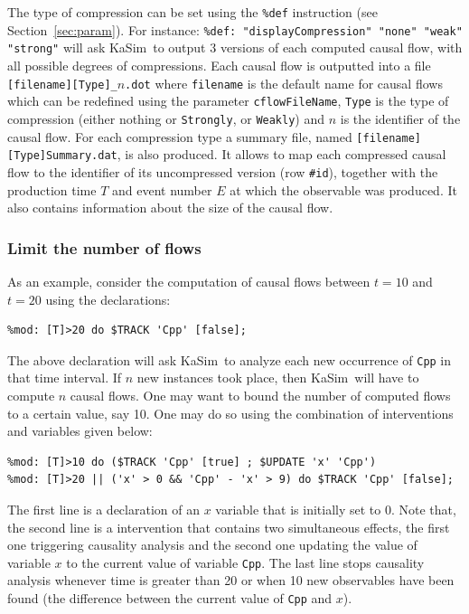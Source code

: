 \documentclass[11pt]{book}
\def\KaSim{\textsf{KaSim}}
\def\ttt#1{\texttt{#1}}
\def\var#1{{\textquotesingle}#1{\textquotesingle}}
\begin{document}
The type of compression can be set using the \texttt{\%def} instruction (see Section~\ref{sec:param}). For instance:
\lstinline[language=kappa]!%def: "displayCompression" "none" "weak" "strong"!
will ask \KaSim~to output 3 versions of each computed causal flow, with all possible degrees of compressions. Each causal flow is outputted into a file \texttt{[filename][Type]\_$n$.dot} where \texttt{filename} is the default name for causal flows which can be redefined using the parameter \texttt{cflowFileName}, \texttt{Type} is the type of compression (either nothing or \texttt{Strongly}, or \texttt{Weakly}) and $n$ is the identifier of the causal flow. For each compression type a summary file, named \texttt{[filename][Type]Summary.dat}, is also produced. It allows to map each compressed causal flow to the identifier of its uncompressed version (row \texttt{\#id}), together with the production time $T$ and event number $E$ at which the observable was produced. It also contains information about the size of the causal flow.

\subsubsection{Limit the number of flows}
As an example, consider the computation of causal flows between $t=10$ and $t=20$ using the declarations:
\begin{lstlisting}[language=kappa]
%mod: [T]>10 do $TRACK 'Cpp' [true];
%mod: [T]>20 do $TRACK 'Cpp' [false];
\end{lstlisting}

The above declaration will ask \KaSim~to analyze each new occurrence of \ttt{\var{Cpp}} in that time interval. If $n$ new instances took place, then \KaSim~will have to compute $n$ causal flows. One may want to bound the number of computed flows to a certain value, say 10. One may do so using the combination of interventions and variables given below:
\begin{lstlisting}[language=kappa]
%var: 'x' 0
%mod: [T]>10 do ($TRACK 'Cpp' [true] ; $UPDATE 'x' 'Cpp')
%mod: [T]>20 || ('x' > 0 && 'Cpp' - 'x' > 9) do $TRACK 'Cpp' [false];
\end{lstlisting}
The first line is a declaration of an $x$ variable that is initially set to 0. Note that, the second line is a intervention that contains two simultaneous effects, the first one triggering causality analysis and the second one updating the value of variable $x$ to the current value of variable \ttt{\var{Cpp}}.
The last line stops causality analysis whenever time is greater than 20 or when 10 new observables have been found (the difference between the current value of \ttt{\var{Cpp}} and $x$).
\end{document}
